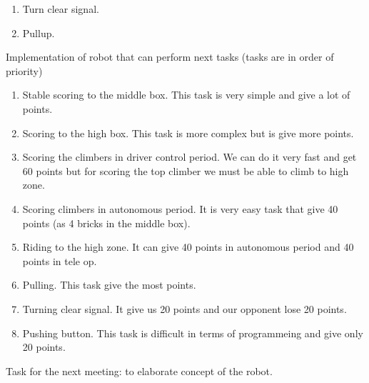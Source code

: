 \begin{enumerate*}
\begin{enumerate}
\begin{enumerate}
	  		\item Turn clear signal.
	  		\item Pullup.
  		\end{enumerate}
  	\end{enumerate}
  	\item Implementation of robot that can perform next tasks (tasks are in order of priority)
  	\begin{enumerate}
  		\item Stable scoring to the middle box. This task is very simple and give a lot of points.
  		\item Scoring to the high box. This task is more complex but is give more points.
  		\item Scoring the climbers in driver control period. We can do it very fast and get 60 points but for scoring the top climber we must be able to climb to high zone.
  		\item Scoring climbers in autonomous period. It is very easy task that give 40 points (as 4 bricks in the middle box).
  		\item Riding to the high zone. It can give 40 points in autonomous period and 40 points in tele op.
  		\item Pulling. This task give the most points.
  		\item Turning clear signal. It give us 20 points and our opponent lose 20 points.
  		\item Pushing button. This task is difficult in terms of programmeing and give only 20 points.
  	\end{enumerate}
	\newline
	
	Task for the next meeting: to elaborate concept of the robot.
  	
  \end{enumerate*}
  

  


\fillpage
